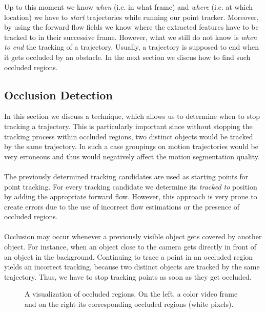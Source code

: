 Up to this moment we know \textit{when} (i.e. in what frame) and \textit{where} (i.e. at which location) we have to \textit{start} trajectories while running our point tracker. Moreover, by using the forward flow fields we know where the extracted features have to be tracked to in their successive frame. However, what we still do not know is \textit{when to end} the tracking of a trajectory. Usually, a trajectory is supposed to end when it gets occluded by an obstacle. In the next section we discus how to find such occluded regions.

\subsection{Occlusion Detection}
\label{sec:occlusion_det}
In this section we discuss a technique, which allows us to determine when to stop tracking a trajectory. This is particularly important since without stopping the tracking process within occluded regions, two distinct objects would be tracked by the same trajectory. In such a case groupings on motion trajectories would be very erroneous and thus would negatively affect the motion segmentation quality. \\ \\
The previously determined tracking candidates are used as starting points for point tracking. For every tracking candidate we determine its \textit{tracked to} position by adding the appropriate forward flow. However, this approach is very prone to create errors due to the use of incorrect flow estimations or the presence of occluded regions. \\ \\
Occlusion may occur whenever a previously visible object gets covered by another object. For instance, when an object close to the camera gets directly in front of an object in the background. Continuing to trace a point in an occluded region yields an incorrect tracking, because two distinct objects are tracked by the same trajectory. Thus, we have to stop tracking points as soon as they get occluded.
\begin{figure}[H]
\begin{center}
\end{center}
\caption[Occluded Regions]{A visualization of occluded regions. On the left, a color video frame and on the right its corresponding occluded regions (white pixels).}
\label{fig:invalid_regions}
\end{figure}

